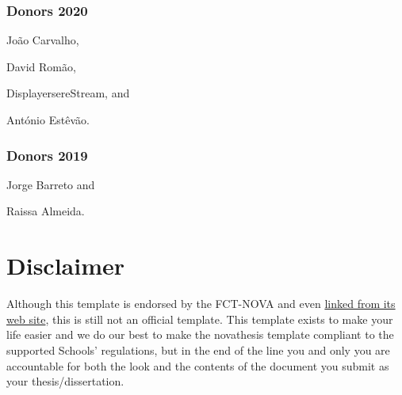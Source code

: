 \subsubsection*{Donors 2020}
\label{ssub:donors_2020}

\begin{inparaitem}[]
  \item João Carvalho, 
  \item David Romão, 
  \item DisplayersereStream, and
  \item António Estêvão.  
\end{inparaitem}

\subsubsection*{Donors 2019}
\label{ssub:donors_2019}

\begin{inparaitem}[]
  \item Jorge Barreto and
  \item Raissa Almeida.  
\end{inparaitem}



\section{Disclaimer}
\label{sec:disclaimer}

Although this template is endorsed by the FCT-NOVA and even \href{https://www.fct.unl.pt/estudante/informacao-academica}{linked from its web site}, this is still not an official template.
%
This template exists to make your life easier and we do our best to make the \gls{novathesis} template compliant to the supported Schools' regulations, but in the end of the line you and only you are accountable for both the look and the contents of the document you submit as your thesis/dissertation.


